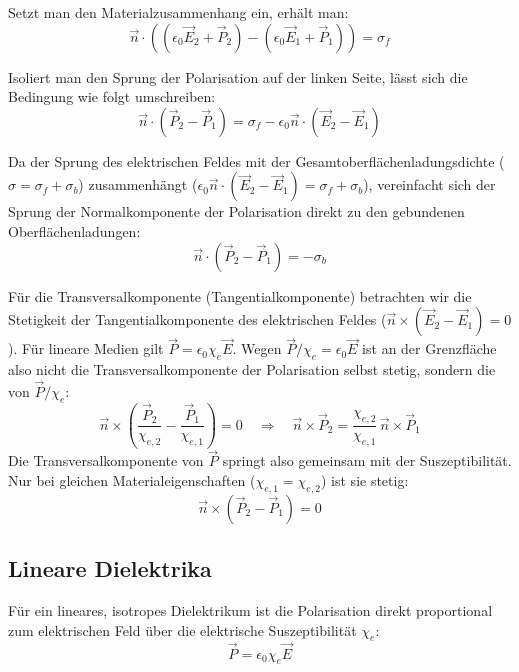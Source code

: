\documentclass[11pt]{article}
\begin{document}
Setzt man den Materialzusammenhang ein, erhält man:
\begin{equation}
    \vec{n} \cdot \left( (\epsilon_0 \vec{E}_2 + \vec{P}_2) - (\epsilon_0 \vec{E}_1 + \vec{P}_1) \right) = \sigma_f
\end{equation}

Isoliert man den Sprung der Polarisation auf der linken Seite, lässt sich die Bedingung wie folgt umschreiben:
\begin{equation}
    \vec{n} \cdot (\vec{P}_2 - \vec{P}_1) = \sigma_f - \epsilon_0 \vec{n} \cdot (\vec{E}_2 - \vec{E}_1)
\end{equation}

Da der Sprung des elektrischen Feldes mit der Gesamtoberflächenladungsdichte ($\sigma = \sigma_f + \sigma_b$) zusammenhängt ($\epsilon_0 \vec{n} \cdot (\vec{E}_2 - \vec{E}_1) = \sigma_f + \sigma_b$), vereinfacht sich der Sprung der Normalkomponente der Polarisation direkt zu den gebundenen Oberflächenladungen:
\begin{equation}
    \vec{n} \cdot (\vec{P}_2 - \vec{P}_1) = -\sigma_b
\end{equation}

Für die Transversalkomponente (Tangentialkomponente) betrachten wir die Stetigkeit der Tangentialkomponente des elektrischen Feldes ($\vec{n} \times (\vec{E}_2 - \vec{E}_1) = 0$). Für lineare Medien gilt $\vec{P} = \epsilon_0 \chi_e \vec{E}$. Wegen $\vec{P}/\chi_e = \epsilon_0 \vec{E}$ ist an der Grenzfläche also nicht die Transversalkomponente der Polarisation selbst stetig, sondern die von $\vec{P}/\chi_e$:
\begin{equation}
    \vec{n} \times \left( \frac{\vec{P}_2}{\chi_{e,2}} - \frac{\vec{P}_1}{\chi_{e,1}} \right) = 0
    \quad \Rightarrow \quad
    \vec{n} \times \vec{P}_2 = \frac{\chi_{e,2}}{\chi_{e,1}} \, \vec{n} \times \vec{P}_1
\end{equation}
Die Transversalkomponente von $\vec{P}$ springt also gemeinsam mit der Suszeptibilität. Nur bei gleichen Materialeigenschaften ($\chi_{e,1} = \chi_{e,2}$) ist sie stetig:
\begin{equation}
    \vec{n} \times (\vec{P}_2 - \vec{P}_1) = 0
\end{equation}

\subsection{Lineare Dielektrika}
Für ein lineares, isotropes Dielektrikum ist die Polarisation direkt proportional zum elektrischen Feld über die elektrische Suszeptibilität $\chi_e$:
\begin{equation}
    \vec{P} = \epsilon_0 \chi_e \vec{E}
\end{equation}
\end{document}
